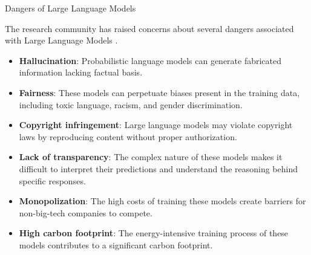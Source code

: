 \documentclass[handout]{beamer}
\begin{document}
\begin{frame}{Dangers of Large Language Models}
\begin{scriptsize}
The research community has raised concerns about several dangers associated with Large Language Models \cite{bender2021dangers}.
\begin{itemize}
\item \textbf{Hallucination}: Probabilistic language models can generate fabricated information lacking factual basis.
\item \textbf{Fairness}: These models can perpetuate biases present in the training data, including toxic language, racism, and gender discrimination.
\item \textbf{Copyright infringement}: Large language models may violate copyright laws by reproducing content without proper authorization.
\item \textbf{Lack of transparency}: The complex nature of these models makes it difficult to interpret their predictions and understand the reasoning behind specific responses.
\item \textbf{Monopolization}: The high costs of training these models create barriers for non-big-tech companies to compete.
\item \textbf{High carbon footprint}: The energy-intensive training process of these models contributes to a significant carbon footprint.
\end{itemize}
\end{scriptsize}
\end{frame}
\end{document}

